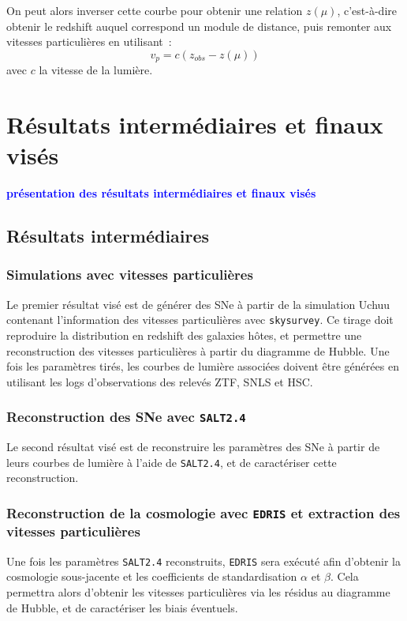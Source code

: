\documentclass{book}
\newcommand{\consignes}[1]{{\textcolor{blue}{\bf \large #1}}}
\def\skysurvey{\texttt{skysurvey}\xspace}
\def\edris{\texttt{EDRIS}\xspace}
\def\saltd{\texttt{SALT2.4}\xspace}
\begin{document}
On peut alors inverser cette courbe pour obtenir une relation $z(\mu)$, c'est-à-dire obtenir le redshift auquel correspond un module de distance, puis remonter aux vitesses particulières en utilisant~:
\begin{equation}
    v_p = c (z_{obs} - z(\mu))
\end{equation}
avec $c$ la vitesse de la lumière.

\section{Résultats intermédiaires et finaux visés}
\consignes{présentation des résultats intermédiaires et finaux visés}

\subsection{Résultats intermédiaires}

\subsubsection{Simulations avec vitesses particulières}

Le premier résultat visé est de générer des SNe à partir de la simulation Uchuu contenant l'information des vitesses particulières avec \skysurvey. Ce tirage doit reproduire la distribution en redshift des galaxies hôtes, et permettre une reconstruction des vitesses particulières à partir du diagramme de Hubble. Une fois les paramètres tirés, les courbes de lumière associées doivent être générées en utilisant les logs d'observations des relevés ZTF, SNLS et HSC.

\subsubsection{Reconstruction des SNe avec \saltd}

Le second résultat visé est de reconstruire les paramètres des SNe à partir de leurs courbes de lumière à l'aide de \saltd, et de caractériser cette reconstruction.

\subsubsection{Reconstruction de la cosmologie avec \edris et extraction des vitesses particulières}

Une fois les paramètres \saltd reconstruits, \edris sera exécuté afin d'obtenir la cosmologie sous-jacente et les coefficients de standardisation $\alpha$ et $\beta$.
Cela permettra alors d'obtenir les vitesses particulières via les résidus au diagramme de Hubble, et de caractériser les biais éventuels.
\end{document}
